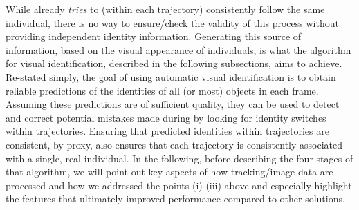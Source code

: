 \documentclass[9pt,lineno]{elife}
\newcommand{\idtracker}{\protect\path{ idtracker.ai}}
\begin{document}
While  already \textit{tries} to (within each trajectory) consistently follow the same individual, there is no way to ensure/check the validity of this process without providing independent identity information. Generating this source of information, based on the visual appearance of individuals, is what the algorithm for visual identification, described in the following subsections, aims to achieve. Re-stated simply, the goal of using automatic visual identification is to obtain reliable predictions of the identities of all (or most) objects in each frame. Assuming these predictions are of sufficient quality, they can be used to detect and correct potential mistakes made during  by looking for identity switches within trajectories. Ensuring that predicted identities within trajectories are consistent, by proxy, also ensures that each trajectory is consistently associated with a single, real individual. In the following, before describing the four stages of that algorithm, we will point out key aspects of how tracking/image data are processed and how we addressed the points (i)-(iii) above and especially highlight the features that ultimately improved performance compared to other solutions. %
\end{document}
